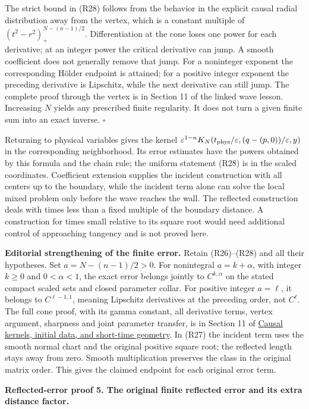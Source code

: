 \documentclass[
  11pt,
]{article}
\begin{document}
The strict bound in (R28) follows from the behavior in the explicit
causal radial distribution away from the vertex, which is a constant
multiple of \((t^2-r^2)_+^{N-(n-1)/2}\). Differentiation at the cone
loses one power for each derivative; at an integer power the critical
derivative can jump. A smooth coefficient does not generally remove that
jump. For a noninteger exponent the corresponding Hölder endpoint is
attained; for a positive integer exponent the preceding derivative is
Lipschitz, while the next derivative can still jump. The complete proof
through the vertex is in Section 11 of the linked wave lesson.
Increasing \(N\) yields any prescribed finite regularity. It does not
turn a given finite sum into an exact inverse. \(\square\)

Returning to physical variables gives the kernel
\(\varepsilon^{1-n}K_N(t_{\rm phys}/\varepsilon,(q-(p,0))/\varepsilon,y)\)
in the corresponding neighborhood. Its error estimates have the powers
obtained by this formula and the chain rule; the uniform statement (R28)
is in the scaled coordinates. Coefficient extension supplies the
incident construction with all centers up to the boundary, while the
incident term alone can solve the local mixed problem only before the
wave reaches the wall. The reflected construction deals with times less
than a fixed multiple of the boundary distance. A construction for times
small relative to its square root would need additional control of
approaching tangency and is not proved here.

\textbf{Editorial strengthening of the finite error.} Retain
(R26)--(R28) and all their hypotheses. Set \(a=N-(n-1)/2>0\). For
nonintegral \(a=k+\alpha\), with integer \(k\geq0\) and \(0<\alpha<1\),
the exact error belongs jointly to \(C^{k,\alpha}\) on the stated
compact scaled sets and closed parameter collar. For positive integer
\(a=\ell\), it belongs to \(C^{\ell-1,1}\), meaning Lipschitz
derivatives at the preceding order, not \(C^\ell\). The full cone proof,
with its gamma constant, all derivative terms, vertex argument,
sharpness and joint parameter transfer, is in Section 11 of
\href{wave-hadamard-kernels.pdf}{Causal
kernels, initial data, and short-time geometry}. In (R27) the incident
term uses the smooth normal chart and the original positive square root;
the reflected length stays away from zero. Smooth multiplication
preserves the class in the original matrix order. This gives the claimed
endpoint for each original error term.

\textbf{Reflected-error proof 5. The original finite reflected error and
its extra distance factor.}
\end{document}
